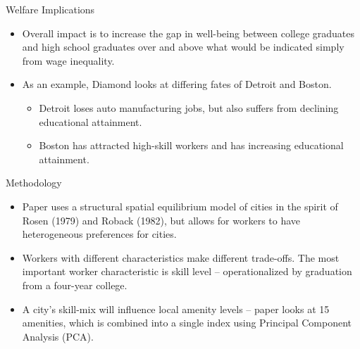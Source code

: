 \documentclass[aspectratio=169]{beamer}
\begin{document}
\begin{frame}{Welfare Implications}

\begin{itemize}
    \item<1-> Overall impact is to increase the gap in well-being between college graduates and high school graduates over and above what would be indicated simply from wage inequality.
    \item<2-> As an example, Diamond looks at differing fates of Detroit and Boston.
    \begin{itemize}
        \item<3-> Detroit loses auto manufacturing jobs, but also suffers from declining educational attainment.
        \item<4-> Boston has attracted high-skill workers and has increasing educational attainment.
    \end{itemize}
\end{itemize}

\end{frame}


\begin{frame}{Methodology}

\begin{itemize}
    \item<1-> Paper uses a structural spatial equilibrium model of cities in the spirit of Rosen (1979) and Roback (1982), but allows for workers to have heterogeneous preferences for cities.
    \item<2-> Workers with different characteristics make different trade-offs.  The most important worker characteristic is skill level – operationalized by graduation from a four-year college.
    \item<3-> A city’s skill-mix will influence local amenity levels – paper looks at 15 amenities, which is combined into a single index using Principal Component Analysis (PCA).
\end{itemize}
    
\end{frame}

\end{document}
